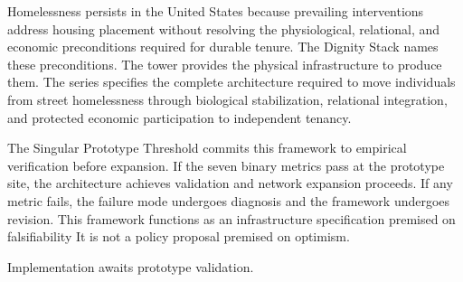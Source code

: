 \documentclass[12pt, letterpaper]{article}
\begin{document}
Homelessness persists in the United States because prevailing interventions address housing placement without resolving the physiological, relational, and economic preconditions required for durable tenure. The Dignity Stack names these preconditions. The tower provides the physical infrastructure to produce them. The series specifies the complete architecture required to move individuals from street homelessness through biological stabilization, relational integration, and protected economic participation to independent tenancy.

The Singular Prototype Threshold commits this framework to empirical verification before expansion. If the seven binary metrics pass at the prototype site, the architecture achieves validation and network expansion proceeds. If any metric fails, the failure mode undergoes diagnosis and the framework undergoes revision. This framework functions as an infrastructure specification premised on falsifiability It is not a policy proposal premised on optimism.

Implementation awaits prototype validation.

\newpage
{}


\end{document}
